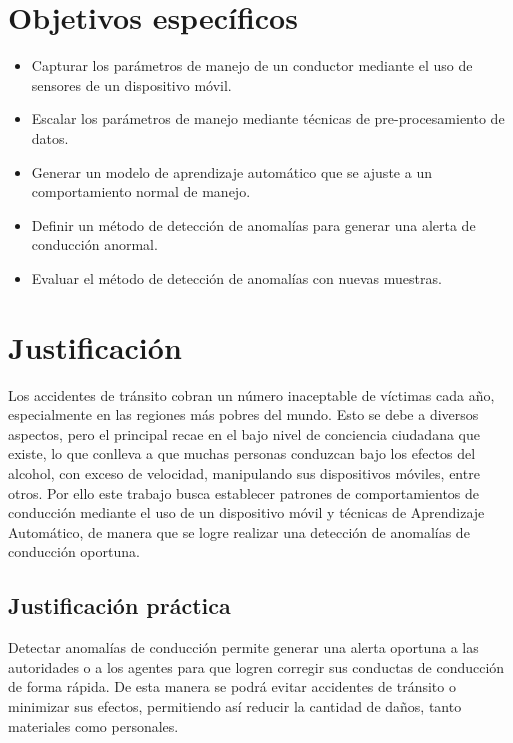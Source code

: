\section{Objetivos específicos}
\begin{itemize}

\item Capturar los parámetros de manejo de un conductor mediante el uso de sensores de un dispositivo móvil.
\item Escalar los parámetros de manejo mediante técnicas de pre-procesamiento de datos.
\item Generar un modelo de aprendizaje automático que se ajuste a un comportamiento normal de manejo.
\item Definir un método de detección de anomalías para generar una alerta de conducción anormal.
\item Evaluar el método de detección de anomalías con nuevas muestras.

\end{itemize}


\section{Justificación}

Los accidentes de tránsito cobran un número inaceptable de víctimas cada a\~{n}o, especialmente en las regiones m\'{a}s pobres del mundo. Esto se debe a diversos aspectos, pero el principal recae en el bajo nivel de conciencia ciudadana que existe, lo que conlleva a que muchas personas conduzcan bajo los efectos del alcohol, con exceso de velocidad, manipulando sus dispositivos m\'{o}viles, entre otros. Por ello este trabajo busca establecer patrones de comportamientos de conducci\'{o}n mediante el uso de un dispositivo m\'{o}vil y t\'{e}cnicas de Aprendizaje Autom\'{a}tico, de manera que se logre realizar una detecci\'{o}n de anomal\'{i}as de conducci\'{o}n oportuna.

\subsection{Justificaci\'{o}n pr\'{a}ctica}

Detectar anomal\'{i}as de conducci\'{o}n permite generar una alerta oportuna a las autoridades o a los agentes para que logren corregir sus conductas de conducci\'{o}n de forma r\'{a}pida. De esta manera se podr\'{a} evitar accidentes de tr\'{a}nsito o minimizar sus efectos, permitiendo as\'{i} reducir la cantidad de da\~{n}os, tanto materiales como personales.

